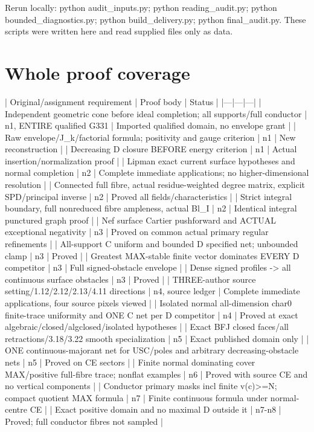 \documentclass[11pt]{article}
\begin{document}
Rerun locally: python audit\_inputs.py; python reading\_audit.py; python bounded\_diagnostics.py; python build\_delivery.py; python final\_audit.py. These scripts were written here and read supplied files only as data.


\section*{Whole proof coverage}

| Original/assignment requirement | Proof body | Status |
|---|---|---|
| Independent geometric cone before ideal completion; all supports/full conductor | n1, ENTIRE qualified G331 | Imported qualified domain, no envelope grant |
| Raw envelope/J\_k/factorial formula; positivity and gauge criterion | n1 | New reconstruction |
| Decreasing D closure BEFORE energy criterion | n1 | Actual insertion/normalization proof |
| Lipman exact current surface hypotheses and normal completion | n2 | Complete immediate applications; no higher-dimensional resolution |
| Connected full fibre, actual residue-weighted degree matrix, explicit SPD/principal inverse | n2 | Proved all fields/characteristics |
| Strict integral boundary, full nonreduced fibre ampleness, actual Bl\_I | n2 | Identical integral punctured graph proof |
| Nef surface Cartier pushforward and ACTUAL exceptional negativity | n3 | Proved on common actual primary regular refinements |
| All-support C uniform and bounded D specified net; unbounded clamp | n3 | Proved |
| Greatest MAX-stable finite vector dominates EVERY D competitor | n3 | Full signed-obstacle envelope |
| Dense signed profiles -> all continuous surface obstacles | n3 | Proved |
| THREE-author source setting/1.12/2.12/2.13/4.11 directions | n4, source ledger | Complete immediate applications, four source pixels viewed |
| Isolated normal all-dimension char0 finite-trace uniformity and ONE C net per D competitor | n4 | Proved at exact algebraic/closed/algclosed/isolated hypotheses |
| Exact BFJ closed faces/all retractions/3.18/3.22 smooth specialization | n5 | Exact published domain only |
| ONE continuous-majorant net for USC/poles and arbitrary decreasing-obstacle nets | n5 | Proved on CE sectors |
| Finite normal dominating cover MAX/positive full-fibre trace; nonflat examples | n6 | Proved with source CE and no vertical components |
| Conductor primary masks incl finite v(c)>=N; compact quotient MAX formula | n7 | Finite continuous formula under normal-centre CE |
| Exact positive domain and no maximal D outside it | n7-n8 | Proved; full conductor fibres not sampled |
\end{document}
